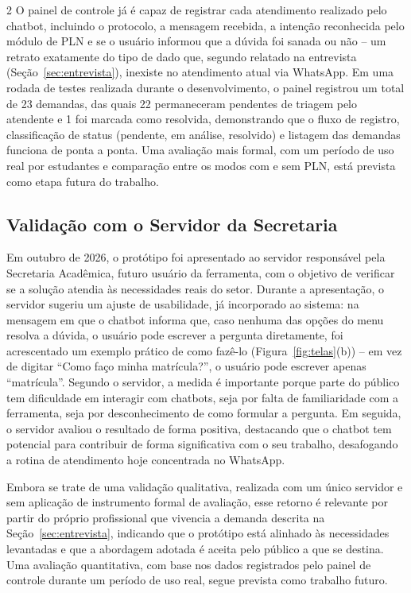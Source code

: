 \documentclass[10pt]{article}
\begin{document}
\begin{multicols}{2}
O painel de controle já é capaz de registrar cada atendimento realizado
pelo chatbot, incluindo o protocolo, a mensagem recebida, a intenção reconhecida pelo módulo de PLN e se o usuário informou que a dúvida foi sanada ou não -- um retrato exatamente do tipo de dado que, segundo
relatado na entrevista (Seção~\ref{sec:entrevista}), inexiste no atendimento atual via
WhatsApp. Em uma rodada de testes realizada durante o desenvolvimento, o
painel registrou um total de 23 demandas, das quais 22 permaneceram
pendentes de triagem pelo atendente e 1 foi marcada como resolvida,
demonstrando que o fluxo de registro, classificação de status (pendente,
em análise, resolvido) e listagem das demandas funciona de ponta a ponta.
Uma avaliação mais formal, com um período de uso real por estudantes e
comparação entre os modos com e sem PLN, está prevista como etapa futura
do trabalho.

\subsection{Validação com o Servidor da Secretaria}

Em outubro de 2026, o protótipo foi apresentado ao servidor responsável
pela Secretaria Acadêmica, futuro usuário da ferramenta, com o objetivo
de verificar se a solução atendia às necessidades reais do setor. Durante
a apresentação, o servidor sugeriu um ajuste de usabilidade, já
incorporado ao sistema: na mensagem em que o chatbot informa que, caso
nenhuma das opções do menu resolva a dúvida, o usuário pode escrever a
pergunta diretamente, foi acrescentado um exemplo prático de como fazê-lo (Figura~\ref{fig:telas}(b))
-- em vez de digitar ``Como faço minha matrícula?'', o usuário pode
escrever apenas ``matrícula''. Segundo o servidor, a medida é importante
porque parte do público tem dificuldade em interagir com chatbots, seja
por falta de familiaridade com a ferramenta, seja por desconhecimento de
como formular a pergunta. Em seguida, o servidor avaliou o resultado de
forma positiva, destacando que o chatbot tem potencial para contribuir de
forma significativa com o seu trabalho, desafogando a rotina de
atendimento hoje concentrada no WhatsApp.

Embora se trate de uma validação qualitativa, realizada com um único
servidor e sem aplicação de instrumento formal de avaliação, esse retorno
é relevante por partir do próprio profissional que vivencia a demanda
descrita na Seção~\ref{sec:entrevista}, indicando que o protótipo está alinhado às
necessidades levantadas e que a abordagem adotada é aceita pelo público
a que se destina. Uma avaliação quantitativa, com base nos dados
registrados pelo painel de controle durante um período de uso real, segue
prevista como trabalho futuro.


\end{multicols}
\end{document}
